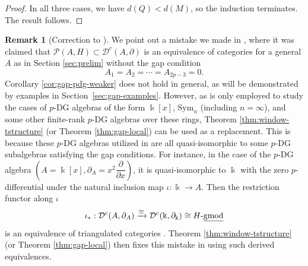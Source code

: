 \documentclass[11pt]{article}
\theoremstyle{definition}
\newtheorem{rem}[thm]{Remark}
\numberwithin{equation}{section}
\def\udgmod{\mbox{-\underline{gmod}}}
\def\mc{\mathcal}
\newcommand{\kk}{\Bbbk}
\newcommand{\Tcat}{\mathcal{P}(A,H)}
\newcommand{\Der}{\mathcal{D}}
\begin{document}
\begin{proof}
In all three cases, we have $d(Q)<d(M)$, so the induction terminates. The result follows.
\end{proof}



\begin{rem}[Correction to {\cite[Theorem 2.17]{EQ1}}]\label{rem:gap-scope}
We point out a mistake we made in \cite[Theorem 2.17]{EQ1}, where it was claimed that
$\Tcat \subset \mc{D}^c(A,\partial)$ is an equivalence of categories for a general $A$ as in Section \ref{sec:prelim} without the gap condition
\begin{equation}
A_1=A_2=\cdots=A_{2p-3}=0.
\end{equation}
Corollary \ref{cor:gap-pdg-weaker} does not hold in general, as will be demonstrated by examples in Section~\ref{sec:gap-examples}. However, as \cite[Theorem 2.7]{EQ1} is only employed to study the cases of $p$-DG algebras of the form $\Bbbk[x]$, $\mathrm{Sym}_n$ (including $n=\infty$), and some other finite-rank $p$-DG algebras over these rings, Theorem \ref{thm:window-tstructure} (or Theorem \ref{thm:gap-local}) can be used as a replacement. This is because these $p$-DG algebras utilized in \cite{EQ1} are all quasi-isomorphic to some $p$-DG subalgebras satisfying the gap conditions.  For instance, in the case of the $p$-DG algebra
$(A=\Bbbk[x],\partial_A=x^2\dfrac{\partial}{\partial x})$, it
is quasi-isomorphic to $\kk$ with the zero $p$-differential under the natural inclusion map $\iota:\kk \to A$. Then the restriction functor along $\iota$
\[
\iota_*:\Der^c(A,\partial_A)\xrightarrow{\cong} \Der^c(\kk,\partial_\kk) \cong H\udgmod
\]
is an equivalence of triangulated categories \cite[Corollary 8.18]{QYHopf}. Theorem \ref{thm:window-tstructure} (or Theorem \ref{thm:gap-local}) then fixes this mistake in \cite{EQ1} using such derived equivalences.
\end{rem}
\end{document}
